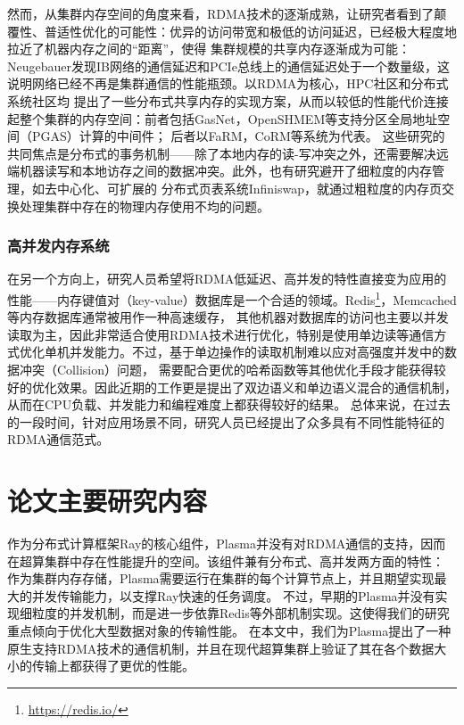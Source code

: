 然而，从集群内存空间的角度来看，RDMA技术的逐渐成熟，让研究者看到了颠覆性、普适性优化的可能性：优异的访问带宽和极低的访问延迟，已经极大程度地拉近了机器内存之间的“距离”，使得
集群规模的共享内存逐渐成为可能：Neugebauer\cite{neugebauer2018understanding}发现IB网络的通信延迟和PCIe总线上的通信延迟处于一个数量级，这说明网络已经不再是集群通信的性能瓶颈。以RDMA为核心，HPC社区和分布式系统社区均
提出了一些分布式共享内存的实现方案，从而以较低的性能代价连接起整个集群的内存空间：前者包括GasNet\cite{bonachea2017gasnet}，OpenSHMEM\cite{chapman2010introducing}等支持分区全局地址空间（PGAS）计算的中间件；
后者以FaRM\cite{dragojevic2014farm}，CoRM\cite{taranov2021corm}等系统为代表。
这些研究的共同焦点是分布式的事务机制——除了本地内存的读-写冲突之外，还需要解决远端机器读写和本地访存之间的数据冲突。此外，也有研究避开了细粒度的内存管理，如去中心化、可扩展的
分布式页表系统Infiniswap\cite{gu2017efficient}，就通过粗粒度的内存页交换处理集群中存在的物理内存使用不均的问题。

\subsubsection{高并发内存系统}

在另一个方向上，研究人员希望将RDMA低延迟、高并发的特性直接变为应用的性能——内存键值对（key-value）数据库是一个合适的领域。Redis\footnote{\url{https://redis.io/}}，Memcached\cite{jose2011memcached}等内存数据库通常被用作一种高速缓存，
其他机器对数据库的访问也主要以并发读取为主，因此非常适合使用RDMA技术进行优化，特别是使用单边读等通信方式优化单机并发能力\cite{mitchell2013using}。不过，基于单边操作的读取机制难以应对高强度并发中的数据冲突（Collision）问题，
需要配合更优的哈希函数\cite{pagh2004cuckoo}等其他优化手段才能获得较好的优化效果。因此近期的工作更是提出了双边语义和单边语义混合的通信机制\cite{kalia2014using}\cite{su2017rfp}，从而在CPU负载、并发能力和编程难度上都获得较好的结果。
总体来说，在过去的一段时间，针对应用场景不同，研究人员已经提出了众多具有不同性能特征的RDMA通信范式\cite{li2021hatrpc}。

\section{论文主要研究内容}

作为分布式计算框架Ray的核心组件，Plasma并没有对RDMA通信的支持，因而在超算集群中存在性能提升的空间。该组件兼有分布式、高并发两方面的特性：
作为集群内存存储，Plasma需要运行在集群的每个计算节点上，并且期望实现最大的并发传输能力，以支撑Ray快速的任务调度。
不过，早期的Plasma并没有实现细粒度的并发机制，而是进一步依靠Redis等外部机制实现。这使得我们的研究重点倾向于优化大型数据对象的传输性能。
在本文中，我们为Plasma提出了一种原生支持RDMA技术的通信机制，并且在现代超算集群上验证了其在各个数据大小的传输上都获得了更优的性能。

